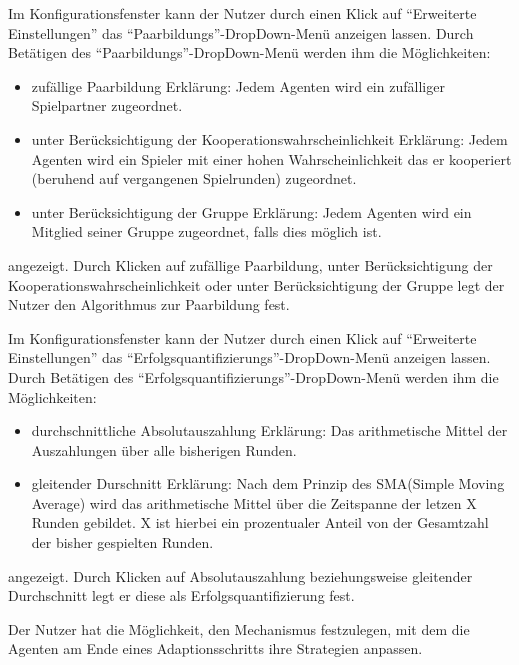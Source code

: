 \documentclass[parskip=full,11pt,twoside]{scrartcl}
\def\adapt{Adaptionsschritt}
\begin{document}
Im Konfigurationsfenster kann der Nutzer durch einen Klick auf \enquote{Erweiterte Einstellungen} das \enquote{Paarbildungs}-DropDown-Menü anzeigen lassen. Durch Betätigen des \enquote{Paarbildungs}-DropDown-Menü werden ihm die Möglichkeiten:\begin{itemize} \itemsep -10pt
\item zufällige Paarbildung
\newline Erklärung: Jedem Agenten wird ein zufälliger Spielpartner zugeordnet.
\item unter Berücksichtigung der Kooperationswahrscheinlichkeit
\newline Erklärung: Jedem Agenten wird ein Spieler mit einer hohen Wahrscheinlichkeit das er kooperiert (beruhend auf vergangenen Spielrunden) zugeordnet.
\item unter Berücksichtigung der Gruppe
\newline Erklärung: Jedem Agenten wird ein Mitglied seiner Gruppe zugeordnet, falls dies möglich ist.
\end{itemize}angezeigt. Durch Klicken auf zufällige Paarbildung, unter Berücksichtigung der Kooperationswahrscheinlichkeit oder unter Berücksichtigung der Gruppe legt der Nutzer den Algorithmus zur Paarbildung fest.


Im Konfigurationsfenster kann der Nutzer durch einen Klick auf \enquote{Erweiterte Einstellungen} das \enquote{Erfolgsquantifizierungs}-DropDown-Menü anzeigen lassen. Durch Betätigen des \enquote{Erfolgsquantifizierungs}-DropDown-Menü werden ihm die Möglichkeiten:\begin{itemize} \itemsep -10pt
\item durchschnittliche Absolutauszahlung
\newline Erklärung: Das arithmetische Mittel der Auszahlungen über alle bisherigen Runden.
\item gleitender Durschnitt
\newline Erklärung: Nach dem Prinzip des SMA(Simple Moving Average) wird das arithmetische Mittel über die Zeitspanne der letzen X Runden gebildet. X ist hierbei ein prozentualer Anteil von der Gesamtzahl der bisher gespielten Runden.
\end{itemize}angezeigt. Durch Klicken auf Absolutauszahlung beziehungsweise gleitender Durchschnitt legt er diese als Erfolgsquantifizierung fest.

Der Nutzer hat die Möglichkeit, den Mechanismus festzulegen, mit dem die Agenten am Ende eines \adapt s ihre Strategien anpassen.
\end{document}
